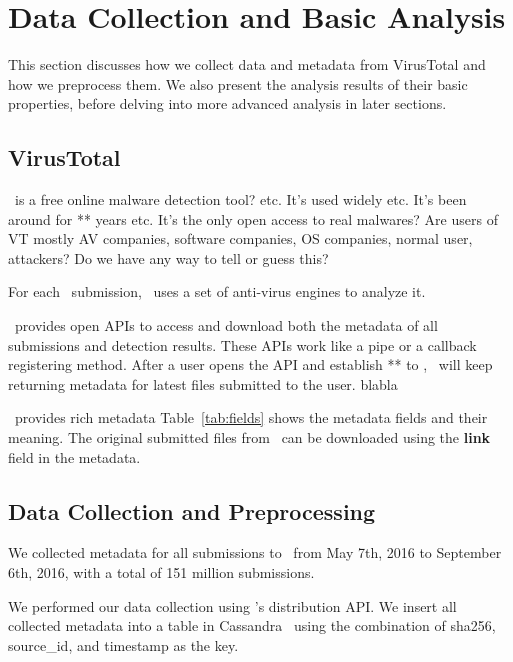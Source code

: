 \section{Data Collection and Basic Analysis}
\label{sec:meth}

This section discusses how we collect data and metadata from VirusTotal
and how we preprocess them.
We also present the analysis results of their basic properties, 
before delving into more advanced analysis in later sections.


\subsection{VirusTotal}
\vt\ is a free online malware detection tool? etc.
It's used widely etc.
It's been around for ** years etc.
It's the only open access to real malwares?
Are users of VT mostly AV companies, software companies, OS companies, normal user, attackers? Do we have any way to tell or guess this?

For each \pe\ submission, \vt\ uses a set of anti-virus engines to analyze it.

\vt\ provides open APIs to access and download both the metadata of all submissions and detection results.
These APIs work like a pipe or a callback registering method.
After a user opens the API and establish ** to \vt, \vt\ will keep returning metadata for latest files submitted to the user.
blabla

\vt\ provides rich metadata
Table~\ref{tab:fields} shows the metadata fields and their meaning.  
The original submitted files from \vt\ can be downloaded using the {\bf link} field in the metadata.

\subsection{Data Collection and Preprocessing}
We collected  metadata for all submissions to \vt\ from May 7th, 2016 to September 6th, 2016,
with a total of 151 million submissions. 

We performed our data collection using \vt{}’s distribution API.
We insert all collected metadata into a table in Cassandra~\cite{Cassandra} 
using the combination of sha256, source\_id, and timestamp as the key. 

